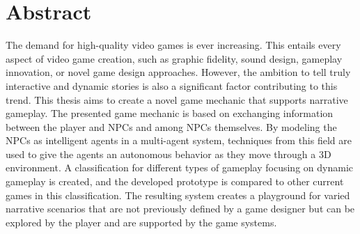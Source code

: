\chapter{Abstract}\label{Abstract}
The demand for high-quality video games is ever increasing. This entails every aspect of video game creation, such as graphic fidelity, sound design, gameplay innovation, or novel game design approaches. However, the ambition to tell truly interactive and dynamic stories is also a significant factor contributing to this trend. This thesis aims to create a novel game mechanic that supports narrative gameplay. The presented game mechanic is based on exchanging information between the player and NPCs and among NPCs themselves. By modeling the NPCs as intelligent agents in a multi-agent system, techniques from this field are used to give the agents an autonomous behavior as they move through a 3D environment. A classification for different types of gameplay focusing on dynamic gameplay is created, and the developed prototype is compared to other current games in this classification. The resulting system creates a playground for varied narrative scenarios that are not previously defined by a game designer but can be explored by the player and are supported by the game systems.